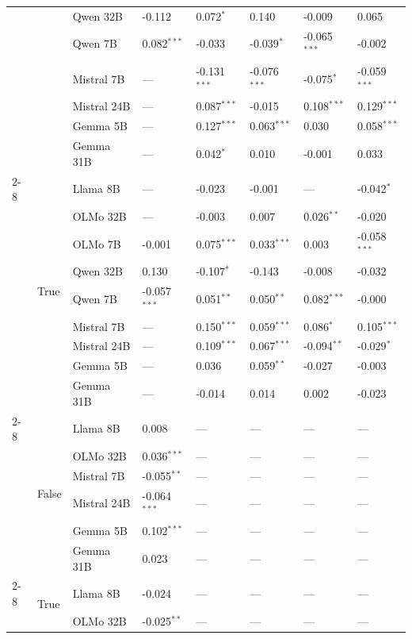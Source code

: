 \begin{longtable}[t]{llllllll}
 &  & Qwen 32B & -0.112 & 0.072$^{*}$ & 0.140 & -0.009 & 0.065 \\
 &  & Qwen 7B & 0.082$^{***}$ & -0.033 & -0.039$^{*}$ & -0.065$^{***}$ & -0.002 \\
 &  & Mistral 7B & --- & -0.131$^{***}$ & -0.076$^{***}$ & -0.075$^{*}$ & -0.059$^{***}$ \\
 &  & Mistral 24B & --- & 0.087$^{***}$ & -0.015 & 0.108$^{***}$ & 0.129$^{***}$ \\
 &  & Gemma 5B & --- & 0.127$^{***}$ & 0.063$^{***}$ & 0.030 & 0.058$^{***}$ \\
 &  & Gemma 31B & --- & 0.042$^{*}$ & 0.010 & -0.001 & 0.033 \\
\cline{2-8}
 & \multirow[t]{9}{*}{True} & Llama 8B & --- & -0.023 & -0.001 & --- & -0.042$^{*}$ \\
 &  & OLMo 32B & --- & -0.003 & 0.007 & 0.026$^{**}$ & -0.020 \\
 &  & OLMo 7B & -0.001 & 0.075$^{***}$ & 0.033$^{***}$ & 0.003 & -0.058$^{***}$ \\
 &  & Qwen 32B & 0.130 & -0.107$^{*}$ & -0.143 & -0.008 & -0.032 \\
 &  & Qwen 7B & -0.057$^{***}$ & 0.051$^{**}$ & 0.050$^{**}$ & 0.082$^{***}$ & -0.000 \\
 &  & Mistral 7B & --- & 0.150$^{***}$ & 0.059$^{***}$ & 0.086$^{*}$ & 0.105$^{***}$ \\
 &  & Mistral 24B & --- & 0.109$^{***}$ & 0.067$^{***}$ & -0.094$^{**}$ & -0.029$^{*}$ \\
 &  & Gemma 5B & --- & 0.036 & 0.059$^{**}$ & -0.027 & -0.003 \\
 &  & Gemma 31B & --- & -0.014 & 0.014 & 0.002 & -0.023 \\
\cline{2-8}
 & \multirow[t]{6}{*}{False} & Llama 8B & 0.008 & --- & --- & --- & --- \\
 &  & OLMo 32B & 0.036$^{***}$ & --- & --- & --- & --- \\
 &  & Mistral 7B & -0.055$^{**}$ & --- & --- & --- & --- \\
 &  & Mistral 24B & -0.064$^{***}$ & --- & --- & --- & --- \\
 &  & Gemma 5B & 0.102$^{***}$ & --- & --- & --- & --- \\
 &  & Gemma 31B & 0.023 & --- & --- & --- & --- \\
\cline{2-8}
 & \multirow[t]{6}{*}{True} & Llama 8B & -0.024 & --- & --- & --- & --- \\
 &  & OLMo 32B & -0.025$^{**}$ & --- & --- & --- & --- \\

\end{longtable}
